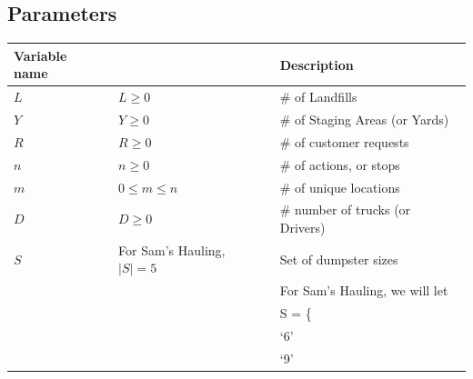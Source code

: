 \documentclass{article}
\begin{document}
\subsection{Parameters}
\begin{tabular}{ l | l | l }
 Variable name                 &                                                                & Description                                                   \\
\hline
  $L$                          & $  L \ge 0                                                  $  & \# of Landfills                                               \\
  $Y$                          & $  Y \ge 0                                                  $  & \# of Staging Areas (or Yards)                                \\
  $R$                          & $  R \ge 0                                                  $  & \# of customer requests                                       \\
  $n$                          & $  n \ge 0                                                  $  & \# of actions, or stops                                       \\
  $m$                          &   $0 \le m \le n$                                              & \# of unique locations                                        \\
  $D$                          & $  D \ge 0                                                  $  & \# number of trucks (or Drivers)                              \\
  $S$                          &   For Sam's Hauling, $ |S| = 5$                                & Set of dumpster sizes                                         \\
                               & $                                                           $  & For Sam's Hauling, we will let                                \\
                               & $                                                           $  & S = \{                                                        \\
                               & $                                                           $  &   `6'                                                         \\
                               & $                                                           $  &   `9'                                                         \\

\end{tabular}
\end{document}
